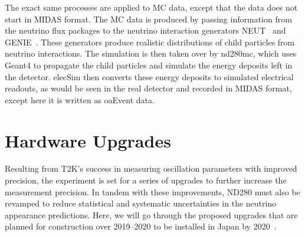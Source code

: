 \documentclass[aps,pra,12pt,notitlepage,tightenlines]{revtex4-1}
\begin{document}
The exact same processes are applied to MC data, except that the data does not start in MIDAS format. The MC data is produced by passing information from the neutrino flux packages to the neutrino interaction generators NEUT~\cite{Hayato:2009zz} and GENIE~\cite{Andreopoulos2010}. These generators produce realistic distributions of child particles from neutrino interactions. The simulation is then taken over by nd280mc, which uses Geant4 to propagate the child particles and simulate the energy deposits left in the detector. elecSim then converts these energy deposits to simulated electrical readouts, as would be seen in the real detector and recorded in MIDAS format, except here it is written as oaEvent data.
 
\section{Hardware Upgrades}
Resulting from T2K's success in measuring oscillation parameters with improved precision, the experiment is set for a series of upgrades to further increase the measurement precision. In tandem with these improvements, ND280 must also be revamped to reduce statistical and systematic uncertainties in the neutrino appearance predictions. Here, we will go through the proposed upgrades that are planned for construction over 2019--2020 to be installed in Japan by 2020~\cite{Blondel:2299599}.
\end{document}
